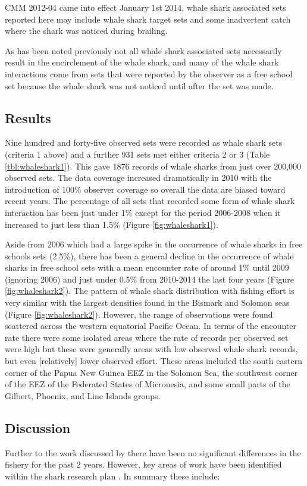\documentclass[12pt]{SCreport}
\begin{document}
CMM 2012-04 came into effect January 1st 2014, whale shark associated sets reported here may include whale shark target sets and some inadvertent catch where the shark was noticed during brailing.

As has been noted previously \citep{OFP2011_a, Harley2013_a} not all whale shark associated sets necessarily result in the encirclement of the whale shark, and many of the whale shark interactions come from sets that were reported by the observer as a free school set because the whale shark was not noticed until after the set was made. 

\subsection{Results}
Nine hundred and forty-five observed sets were recorded as whale shark sets (criteria 1 above) and a further 931 sets met either criteria 2 or 3 (Table  \ref{tbl:whaleshark1}). This gave 1876 records of whale sharks from just over 200,000 observed sets. The data coverage increased dramatically in 2010 with the introduction of 100\% observer coverage so overall the data are biased toward recent years. The percentage of all sets that recorded some form of whale shark interaction has been just under 1\% except for the period 2006-2008 when it increased to just less than 1.5\% (Figure \ref{fig:whaleshark1}).

Aside from 2006 which had a large spike in the occurrence of whale sharks in free schools sets (2.5\%), there has been a general decline in the occurrence of whale sharks in free school sets with a mean encounter rate of around 1\%  until 2009 (ignoring 2006) and just under 0.5\% from 2010-2014 the last four years (Figure \ref{fig:whaleshark2}).  The pattern of whale shark distribution with fishing effort is very similar with the largest densities found in the Bismark and Solomon seas (Figure \ref{fig:whaleshark2}). However, the range of observations were found scattered across the western equatorial Pacific Ocean. In terms of the encounter rate there were some isolated areas where the rate of records per observed set were high but these were generally areas with low observed whale shark records, but even [relatively] lower observed effort. These areas included the south eastern corner of the Papua New Guinea EEZ in the Solomon Sea, the southwest corner of the EEZ of the Federated States of Micronesia, and some small parts of the Gilbert, Phoenix, and Line Islands groups.
  
\subsection{Discussion}  
Further to the work discussed by \citet{Harley2013_a} there have been no significant differences in the fishery for the past 2 years.  However, key areas of work have been identified within the shark research plan \citep{Brouwer2015_b}.  In summary these include:
\end{document}
